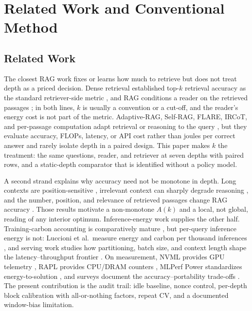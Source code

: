 \documentclass[a4paper,fleqn]{cas-sc}
\begin{document}
\section{Related Work and Conventional Method}\label{sec:conventional}

\subsection{Related Work}\label{sec:related}

The closest RAG work fixes or learns how much to retrieve but does not treat depth as a priced decision. Dense retrieval established top-$k$ retrieval accuracy as the standard retriever-side metric \cite{karpukhin2020dpr}, and RAG conditions a reader on the retrieved passages \cite{lewis2020rag}; in both lines, $k$ is usually a convention or a cut-off, and the reader's energy cost is not part of the metric. Adaptive-RAG, Self-RAG, FLARE, IRCoT, and per-passage computation adapt retrieval or reasoning to the query \cite{jeong2024adaptiverag,asai2024selfrag,jiang2023flare,trivedi2023ircot,wu2020dontread}, but they evaluate accuracy, FLOPs, latency, or API cost rather than joules per correct answer and rarely isolate depth in a paired design. This paper makes $k$ the treatment: the same questions, reader, and retriever at seven depths with paired rows, and a static-depth comparator that is identified without a policy model.

A second strand explains why accuracy need not be monotone in depth. Long contexts are position-sensitive \cite{liu2023lost}, irrelevant context can sharply degrade reasoning \cite{shi2023distracted}, and the number, position, and relevance of retrieved passages change RAG accuracy \cite{cuconasu2024noise}. Those results motivate a non-monotone $A(k)$ and a local, not global, reading of any interior optimum. Inference-energy work supplies the other half. Training-carbon accounting is comparatively mature \cite{strubell2019,henderson2020,patterson2021,dodge2022}, but per-query inference energy is not: Luccioni et al.\ measure energy and carbon per thousand inferences \cite{luccioni2024power}, and serving work studies how partitioning, batch size, and context length shape the latency--throughput frontier \cite{pope2023efficient,kwon2023pagedattention}. On measurement, NVML provides GPU telemetry \cite{nvml}, RAPL provides CPU/DRAM counters \cite{david2010rapl}, MLPerf Power standardizes energy-to-solution \cite{tschand2025mlperfpower}, and surveys document the accuracy--portability trade-offs \cite{garcia2019estimation}. The present contribution is the audit trail: idle baseline, nonce control, per-depth block calibration with all-or-nothing factors, repeat CV, and a documented window-bias limitation.
\end{document}
